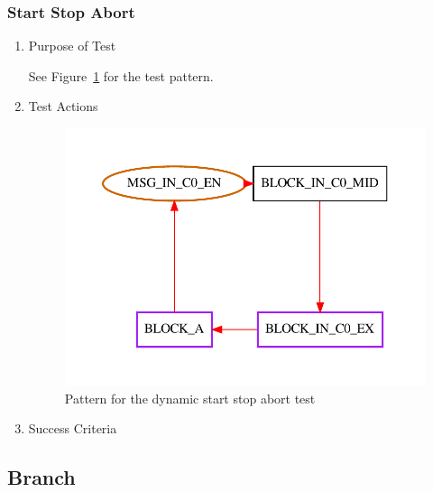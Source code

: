 \documentclass[12pt,a4paper]{report}
\begin{document}
\subsubsection{Start Stop Abort}
\begin{enumerate}
	\item Purpose of Test

	See Figure~\ref{fig:Pattern_for_the_dynamic_start_stop_abort_test} for the test pattern.
	\item Test Actions
    \begin{figure}
        \centering 
        \includegraphics{TestPattern/dynamic_basic_start_stop_abort.pdf}
        \caption{Pattern for the dynamic start stop abort test}
        \label{fig:Pattern_for_the_dynamic_start_stop_abort_test}
    \end{figure}
	\item Success Criteria
\end{enumerate}
\subsection{Branch}
\end{document}
